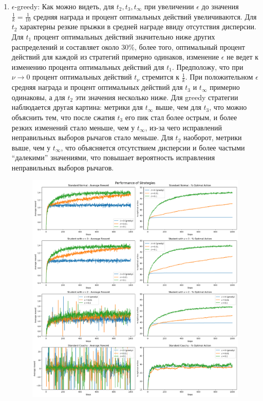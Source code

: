 \documentclass{article}
\begin{document}
\begin{enumerate}
    \item $\epsilon$-greedy: Как можно видеть, для $t_2, t_3, t_{\infty}$ при увеличении $\epsilon$ до значения $\frac{1}{k} = \frac{1}{10}$ средняя награда и процент оптимальных действий увеличиваются. Для $t_2$ характерны резкие прыжки в средней награде ввиду отсутствия дисперсии. Для $t_1$ процент оптимальных действий значительно ниже других распределений и составляет около $30\%$, более того, оптимальный процент действий для каждой из стратегий примерно одинаков, изменение $\epsilon$ не ведет к изменению процента оптимальных действий для $t_1$. Предположу, что при $\nu \to 0$ процент оптимальных действий $t_{\nu}$ стремится к $\frac{1}{k}$. При положительном $\epsilon$ средняя награда и процент оптимальных действий для $t_3$ и $t_{\infty}$ примерно одинаковы, а для $t_2$ эти значения несколько ниже. Для greedy стратегии наблюдается другая картина: метрики для $t_{\infty}$ выше, чем для $t_3$, что можно объяснить тем, что после сжатия $t_3$ его пик стал более острым, и более резких изменений стало меньше, чем у $t_{\infty}$, из-за чего исправлений неправильных выборов рычагов стало меньше. Для $t_2$ наоборот, метрики выше, чем у $t_{\infty}$, что объясняется отсутствием дисперсии и более частыми ``далекими'' значениями, что повышает вероятность исправления неправильных выборов рычагов.
    \begin{figure}
        \centering
        \includegraphics[width=1.1\linewidth]{eps_greedy_1.jpg}

\end{figure}
\end{enumerate}
\end{document}
